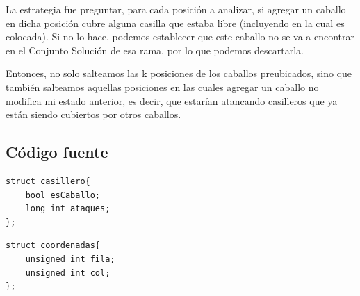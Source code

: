 La estrategia fue preguntar, para cada posición a analizar, si agregar un caballo en dicha posici\'on cubre alguna casilla que estaba libre (incluyendo en la cual es colocada). Si no lo hace, podemos establecer que este caballo no se va a encontrar en el Conjunto Solución de esa rama, por lo que podemos descartarla.

Entonces, no solo salteamos las k posiciones de los caballos preubicados, sino que también salteamos aquellas posiciones en las cuales agregar un caballo no modifica mi estado anterior, es decir, que estar\'ian atancando casilleros que ya est\'an siendo cubiertos por otros caballos.
  
\newpage

\subsection{C\'odigo fuente}
	\begin{codesnippet}
	\begin{verbatim}
struct casillero{
    bool esCaballo;
    long int ataques;
};
	\end{verbatim}
	\end{codesnippet}

	\begin{codesnippet}
	\begin{verbatim}
struct coordenadas{
    unsigned int fila;
    unsigned int col;
};
	\end{verbatim}
	\end{codesnippet}


